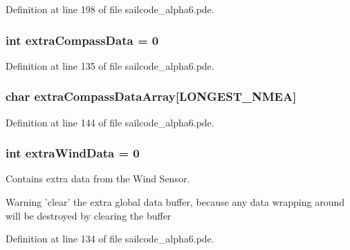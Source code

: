 \-Definition at line 198 of file sailcode\-\_\-alpha6.\-pde.

\hypertarget{group__group1_gaafded9aee7842e71393cafc5ac68d921}{
\subsubsection[{extra\-Compass\-Data}]{\setlength{\rightskip}{0pt plus 5cm}int {\bf extra\-Compass\-Data} = 0}}
\label{group__group1_gaafded9aee7842e71393cafc5ac68d921}


\-Definition at line 135 of file sailcode\-\_\-alpha6.\-pde.

\hypertarget{group__group1_ga87dbc2b6143e295eae5c571f1b5f460d}{
\subsubsection[{extra\-Compass\-Data\-Array}]{\setlength{\rightskip}{0pt plus 5cm}char {\bf extra\-Compass\-Data\-Array}\mbox{[}\-L\-O\-N\-G\-E\-S\-T\-\_\-\-N\-M\-E\-A\mbox{]}}}
\label{group__group1_ga87dbc2b6143e295eae5c571f1b5f460d}


\-Definition at line 144 of file sailcode\-\_\-alpha6.\-pde.

\hypertarget{group__group1_gaf9d919ceea98cf74d8ee327ca87871ee}{
\subsubsection[{extra\-Wind\-Data}]{\setlength{\rightskip}{0pt plus 5cm}int {\bf extra\-Wind\-Data} = 0}}
\label{group__group1_gaf9d919ceea98cf74d8ee327ca87871ee}


\-Contains extra data from the \-Wind \-Sensor. 

\begin{DoxyWarning}{\-Warning}
'clear' the extra global data buffer, because any data wrapping around will be destroyed by clearing the buffer 
\end{DoxyWarning}


\-Definition at line 134 of file sailcode\-\_\-alpha6.\-pde.


